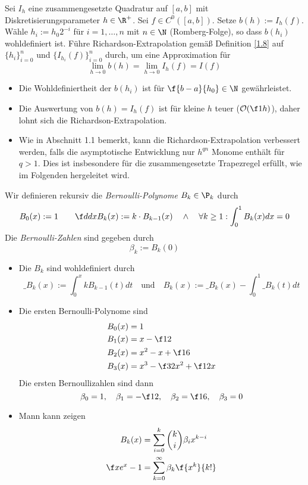 \documentclass[11pt]{scrartcl}
\begin{document}
\begin{df}
	\label{2.33}
	Sei $I_h$ eine zusammengesetzte Quadratur auf $[a,b]$ mit Diskretisierungsparameter $h\in \R^+$.
	Sei $f\in C^0([a,b])$.
	Setze $b(h) := I_h(f)$.
	Wähle $h_i := h_0 2^{-i}$ für $i=1,\dotsc,n$ mit $n\in \N$ (Romberg-Folge), so dass $b(h_i)$ wohldefiniert ist.
	Führe Richardson-Extrapolation gemäß Definition \ref{1.8} auf $\{h_i\}_{i=0}^n$ und $\{I_{h_i}(f)\}_{i=0}^n$ durch, um eine Approximation für
	\[
		\lim_{h\to 0} b(h) = \lim_{h\to 0} I_h(f) = I(f)
	\]
	\begin{note}
		\begin{itemize}
			\item
				Die Wohldefiniertheit der $b(h_i)$ ist für $\f{b-a}{h_0} \in \N$ gewährleistet.
			\item
				Die Auswertung von $b(h) = I_h(f)$ ist für kleine $h$ teuer ($\mathcal O(\f 1h)$), daher lohnt sich die Richardson-Extrapolation.
			\item
				Wie in Abschnitt 1.1 bemerkt, kann die Richardson-Extrapolation verbessert werden, falls die asymptotische Entwicklung nur $h^{qn}$ Monome enthält für $q>1$.
				Dies ist insbesondere für die zusammengesetzte Trapezregel erfüllt, wie im Folgenden hergeleitet wird.
		\end{itemize}
	\end{note}
\end{df}

\begin{df}
	\label{2.34}
	Wir definieren rekursiv die \emph{Bernoulli-Polynome} $B_k \in \P_k$ durch
	\[
		B_0(x) := 1 \qquad
		\f d{dx} B_k(x) := k \cdot B_{k-1}(x) \quad \land \quad \forall k\ge 1 : \int_0^1 B_k(x) dx = 0
	\]
	Die \emph{Bernoulli-Zahlen} sind gegeben durch
	\[
		\beta_k := B_k(0)
	\]
	\begin{note}
		\begin{itemize}
			\item
				Die $B_k$ sind wohldefiniert durch
				\[
					\_{B_k}(x) := \int_0^x k B_{k-1}(t) dt 
					\quad \text{und} \quad
					B_k(x) := \_{B_k}(x) - \int_0^1 \_{B_k}(t) dt
				\]
			\item
				Die ersten Bernoulli-Polynome sind
				\begin{align*}
					B_0(x) &= 1  \\
					B_1(x) &= x - \f 12 \\
					B_2(x) &= x^2 - x + \f 16 \\
					B_3(x) &= x^3 - \f 32 x^2 + \f 12 x
				\end{align*}
				Die ersten Bernoullizahlen sind dann
				\[
					\beta_0 = 1, \quad
					\beta_1 = -\f 12, \quad
					\beta_2 = \f 16, \quad
					\beta_3 = 0
				\]
			\item
				Mann kann zeigen
				\begin{align*}
					B_k(x) &= \sum_{i=0}^k \binom ki \beta_i x^{k-i} \\
					\f x{e^x - 1} &= \sum_{k=0}^\infty \beta_k \f {x^k}{k!}
				\end{align*}
		\end{itemize}
	\end{note}
\end{df}
\end{document}
